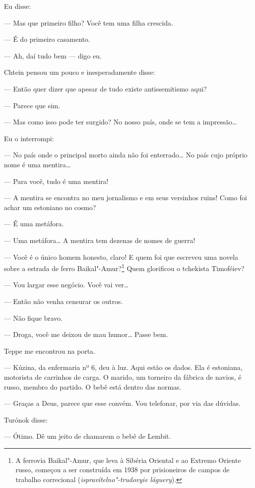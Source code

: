 Eu disse:

--- Mas que primeiro filho? Você tem uma filha crescida.

--- É do primeiro casamento.

--- Ah, daí tudo bem --- digo eu.

Chtein pensou um pouco e inesperadamente disse:

--- Então quer dizer que apesar de tudo existe antissemitismo aqui?

--- Parece que sim.

--- Mas como isso pode ter surgido? No nosso país, onde se tem a
impressão\ldots{}

Eu o interrompi:

--- No país onde o principal morto ainda não foi enterrado\ldots{} No país
cujo próprio nome é uma mentira\ldots{}

--- Para você, tudo é uma mentira!

--- A mentira se encontra no meu jornalismo e em seus versinhos ruins!
Como foi achar um estoniano no cosmo?

--- É uma metáfora.

--- Uma metáfora\ldots{} A mentira tem dezenas de nomes de guerra!

--- Você é o único homem honesto, claro! E quem foi que escreveu uma
novela sobre a estrada de ferro Baikal"-Amur?\footnote{A ferrovia
  Baikal"-Amur, que leva à Sibéria Oriental e ao Extremo Oriente russo,
  começou a ser construída em 1938 por prisioneiros de campos de
  trabalho correcional (\emph{ispravítelno"-trudovyie láguery}).} Quem
glorificou o tchekista Timoféiev?

--- Vou largar esse negócio. Você vai ver\ldots{}

--- Então não venha censurar os outros.

--- Não fique bravo.

--- Droga, você me deixou de mau humor\ldots{} Passe bem.

Teppe me encontrou na porta.

--- Kúzina, da enfermaria nº 6, deu à luz. Aqui estão os dados. Ela é \label{ref4}
estoniana, motorista de carrinhos de carga. O marido, um torneiro da
fábrica de navios, é russo, membro do partido. O bebê está dentro das
normas.

--- Graças a Deus, parece que esse convém. Vou telefonar, por via das
dúvidas.

Turónok disse:

--- Ótimo. Dê um jeito de chamarem o bebê de Lembit.

